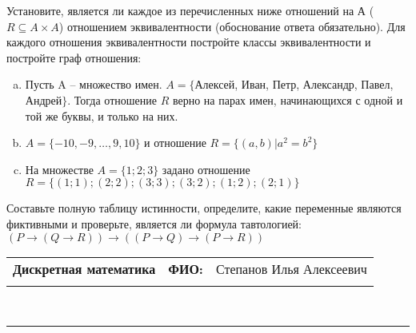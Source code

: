 \documentclass[10pt]{exam}
\newcommand{\class}{Дискретная математика}
\newcommand{\examdate}{}
\begin{document}
\begin{questions}
\question
Установите, является ли каждое из перечисленных ниже отношений на А ($R \subseteq A \times A$) отношением эквивалентности (обоснование ответа обязательно). Для каждого отношения эквивалентности постройте классы 
эквивалентности и постройте граф отношения:
\begin{enumerate} [a)]\setcounter{enumi}{0}
\item Пусть A – множество имен. $A = \{ $Алексей, Иван, Петр, Александр, Павел, Андрей$ \}$. Тогда отношение $R$ верно на парах имен, начинающихся с одной и той же буквы, и только на них.
\item $A = \{-10, -9, … , 9, 10\}$ и отношение $ R = \{(a,b)|a^{2} = b^{2}\}$
\item На множестве $A = \{1; 2; 3\}$ задано отношение $R = \{(1; 1); (2; 2); (3; 3); (3; 2); (1; 2); (2; 1)\}$
\end{enumerate}\question Составьте полную таблицу истинности, определите, какие переменные являются фиктивными и проверьте, является ли формула тавтологией:
$(P \rightarrow (Q \rightarrow R)) \rightarrow ((P \rightarrow Q) \rightarrow (P \rightarrow R))$

\end{questions}
\newpage
\begin{flushright}
\begin{tabular}{p{2.8in} r l}
\textbf{\class} & \textbf{ФИО:} &Степанов Илья Алексеевич
\\

\textbf{\examdate} &&\\
\end{tabular}\\
\end{flushright}
\rule[1ex]{\textwidth}{.1pt}
\end{document}
